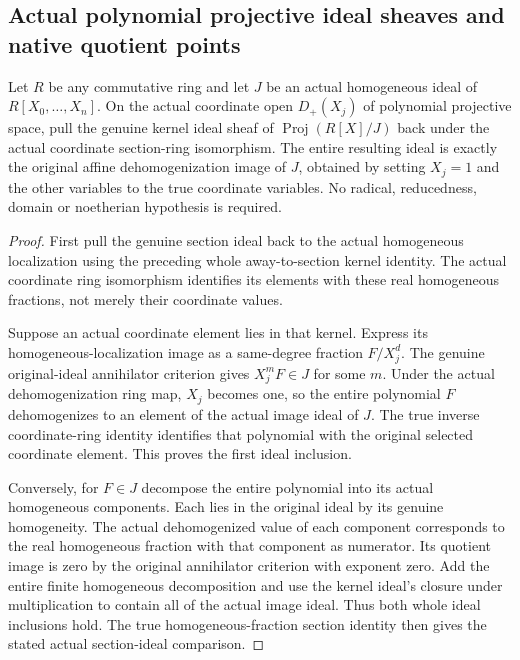\subsection{Actual polynomial projective ideal sheaves and native quotient points}
\label{subsec:native-homogeneous-quotients}

\begin{theorem}
\label{graded:native-polynomial-quotient-coordinate-ideal}
\leanok
{}
Let $R$ be any commutative ring and let $J$ be an actual homogeneous
ideal of $R[X_0,\ldots,X_n]$. On the actual coordinate open $D_+(X_j)$
of polynomial projective space, pull the genuine kernel ideal sheaf of
$\operatorname{Proj}(R[X]/J)$ back under the actual coordinate
section-ring isomorphism. The entire resulting ideal is exactly the
original affine dehomogenization image of $J$, obtained by setting
$X_j=1$ and the other variables to the true coordinate variables.
No radical, reducedness, domain or noetherian hypothesis is required.
\end{theorem}
\begin{proof}
First pull the genuine section ideal back to the actual homogeneous
localization using the preceding whole away-to-section kernel identity.
The actual coordinate ring isomorphism identifies its elements with
these real homogeneous fractions, not merely their coordinate values.

Suppose an actual coordinate element lies in that kernel. Express its
homogeneous-localization image as a same-degree fraction $F/X_j^d$.
The genuine original-ideal annihilator criterion gives $X_j^mF\in J$
for some $m$. Under the actual dehomogenization ring map, $X_j$ becomes
one, so the entire polynomial $F$ dehomogenizes to an element of the
actual image ideal of $J$. The true inverse coordinate-ring identity
identifies that polynomial with the original selected coordinate
element. This proves the first ideal inclusion.

Conversely, for $F\in J$ decompose the entire polynomial into its
actual homogeneous components. Each lies in the original ideal by
its genuine homogeneity. The actual dehomogenized value of each
component corresponds to the real homogeneous fraction with that
component as numerator. Its quotient image is zero by the original
annihilator criterion with exponent zero. Add the entire finite
homogeneous decomposition and use the kernel ideal's closure under
multiplication to contain all of the actual image ideal. Thus both
whole ideal inclusions hold. The true homogeneous-fraction section
identity then gives the stated actual section-ideal comparison.
\end{proof}

